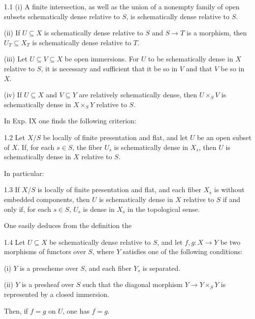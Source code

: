\begin{proposition}{1.1}\label{XVIII.1.1}
(i) A finite intersection, as well as the union of a nonempty
family of open subsets schematically dense relative to \(S\),
is schematically dense relative to \(S\).

(ii) If \(U\subseteq X\) is schematically dense relative to
\(S\) and \(S\to T\) is a morphism, then
\(U_T\subseteq X_T\) is schematically dense relative to \(T\).

(iii) Let \(U\subseteq V\subseteq X\) be open immersions.
For \(U\) to be schematically dense in \(X\) relative to
\(S\), it is necessary and sufficient that it be so in
\(V\) and that \(V\) be so in \(X\).

(iv) If \(U\subseteq X\) and \(V\subseteq Y\) are relatively
schematically dense, then \(U\times_S V\) is schematically
dense in \(X\times_S Y\) relative to \(S\).
\end{proposition}
In Exp. IX one finds the following criterion:
\begin{proposition}{1.2}\label{XVIII.1.2}
Let \(X/S\) be locally of finite presentation and flat,
and let \(U\) be an open subset of \(X\).
If, for each \(s\in S\), the fiber \(U_s\) is schematically
dense in \(X_s\), then \(U\) is schematically dense in \(X\)
relative to \(S\).
\end{proposition}
In particular:
\begin{corollary}{1.3}\label{XVIII.1.3}
If \(X/S\) is locally of finite presentation and flat,
and each fiber \(X_s\) is \og without embedded components\fg,
then \(U\) is schematically dense in \(X\) relative to \(S\)
if and only if, for each \(s\in S\), \(U_s\) is dense in
\(X_s\) in the topological sense.
\end{corollary}
One easily deduces from the definition the
\begin{proposition}{1.4}\label{XVIII.1.4}
Let \(U\subseteq X\) be schematically dense relative to
\(S\), and let \(f,g:X\to Y\) be two morphisms of functors
over \(S\), where \(Y\) satisfies one of the following conditions:

(i) \(Y\) is a prescheme over \(S\), and each fiber \(Y_s\)
is separated.

(ii) \(Y\) is a presheaf over \(S\) such that the diagonal morphism
\(Y\to Y\times_S Y\) is represented by a closed immersion.

Then, if \(f=g\) on \(U\), one has \(f=g\).
\end{proposition}
